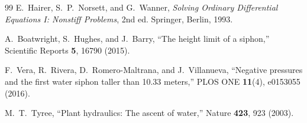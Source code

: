 \documentclass[11pt]{article}
\begin{document}
\begin{thebibliography}{99}
E.~Hairer, S.~P.~Norsett, and G.~Wanner,
\emph{Solving Ordinary Differential Equations I: Nonstiff Problems}, 2nd ed.
Springer, Berlin, 1993.

A.~Boatwright, S.~Hughes, and J.~Barry,
``The height limit of a siphon,''
Scientific Reports \textbf{5}, 16790 (2015).

F.~Vera, R.~Rivera, D.~Romero-Maltrana, and J.~Villanueva,
``Negative pressures and the first water siphon taller than 10.33 meters,''
PLOS ONE \textbf{11}(4), e0153055 (2016).

M.~T.~Tyree,
``Plant hydraulics: The ascent of water,''
Nature \textbf{423}, 923 (2003).

\end{thebibliography}
\end{document}
